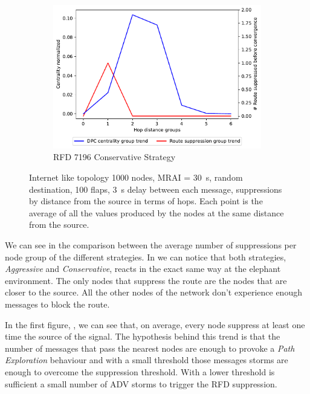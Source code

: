 \begin{figure}[h]
     \hfill
     \begin{subfigure}[b]{0.49\textwidth}
         \centering
         \includegraphics[width=\textwidth]{images/RFD/miceVSelephants/elephants/cisco_1000_RFD_7196_conservative_nodeConvergence_centVSsup_trend.pdf}
         \caption{RFD 7196 Conservative Strategy}
         \label{fig:1000_7196RFDC_cent_VS_sup_elephants}
     \end{subfigure}
		\caption{Internet like topology \num{1000} nodes, \ac{MRAI} = \SI{30}{\second},
		random destination, \num{100} flaps, \SI{3}{\second} delay between each
		message, suppressions by distance from the source in terms of hops.
		Each point is the average of all the values produced by the nodes at the
		same distance from the source.}
        \label{fig:1000_RFD_cent_VS_sup_elephants}
\end{figure}

We can see in  the comparison between
the average number of suppressions per node group of the different strategies.
In 
we can notice that both strategies, \textit{Aggressive} and \textit{Conservative},
reacts in the exact same way at the elephant environment.
The only nodes that suppress the route are the nodes that are closer to the source.
All the other nodes of the network don't experience enough messages to block
the route.

In the first figure, , we can see
that, on average, every node suppress at least one time the source of the
signal.
The hypothesis behind this trend is that the number of messages that pass the
nearest nodes are enough to provoke a \textit{Path Exploration} behaviour and
with a small threshold those messages storms are enough to overcome the suppression
threshold.
With a lower threshold is sufficient a small number of \ac{ADV} storms
to trigger the \ac{RFD} suppression.


